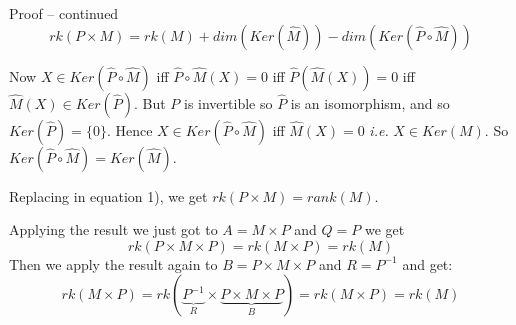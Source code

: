 \documentclass{beamer}
\begin{document}
  \begin{frame}{Proof -- continued}
    \begin{equation} rk(P \times M) = rk(M) + dim(Ker(\widehat{M})) - dim(Ker(\widehat{P} \circ \widehat{M})) \end{equation}
    
    Now $X \in Ker(\widehat{P} \circ \widehat{M})$ iff $\widehat{P} \circ \widehat{M}(X) = 0$ iff $\widehat{P}(\widehat{M}(X)) = 0$ iff $\widehat{M}(X) \in Ker(\widehat{P})$. But $P$ is invertible so $\widehat{P}$ is an isomorphism, and so $Ker(\widehat{P}) = \{0\}$. Hence $X \in Ker(\widehat{P} \circ \widehat{M})$ iff $\widehat{M}(X) = 0$ \emph{i.e.} $X \in Ker(M)$. So $Ker(\widehat{P} \circ \widehat{M}) = Ker(\widehat{M})$.

    Replacing in equation 1), we get $rk(P \times M) = rank(M)$.

    Applying the result we just got to $A = M \times P$ and $Q = P$ we get
    \[rk(P \times M \times P) = rk(M \times P) = rk(M) \]
    Then we apply the result again to $B = P \times M \times P$ and $R = P^{-1}$ and get:
    \[rk(M \times P) = rk(\underbrace{P^{-1}}_{R} \times \underbrace{P \times  M \times P}_{B}) = rk(M \times P) = rk(M) \]
  
  
  \end{frame}
\end{document}
